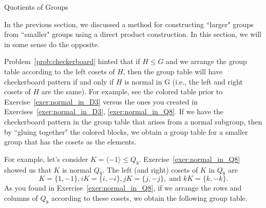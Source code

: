 \begin{section}{Quotients of Groups}

In the previous section, we discussed a method for constructing ``larger" groups from ``smaller" groups using a direct product construction.  In this section, we will in some sense do the opposite.

Problem~\ref{prob:checkerboard} hinted that if $H\leq G$ and we arrange the group table according to the left cosets of $H$, then the group table will have checkerboard pattern if and only if $H$ is normal in G (i.e., the left and right cosets of $H$ are the same).  For example, see the colored table prior to Exercise~\ref{exer:normal_in_D3} versus the ones you created in Exercises~\ref{exer:normal_in_D3}, \ref{exer:normal_in_Q8}.  If we have the checkerboard pattern in the group table that arises from a normal subgroup, then by ``gluing together" the colored blocks, we obtain a group table for a smaller group that has the cosets as the elements. 

For example, let's consider $K=\langle -1\rangle \leq Q_8$.  Exercise~\ref{exer:normal_in_Q8} showed us that $K$ is normal $Q_8$.  The left (and right) cosets of $K$ in $Q_8$ are
\[
K=\{1,-1\}, iK=\{i,-i\}, jK=\{j,-j\}, \text{ and } kK=\{k,-k\}.
\]
As you found in Exercise~\ref{exer:normal_in_Q8}, if we arrange the rows and columns of $Q_8$ according to these cosets, we obtain the following group table.


\end{section}
